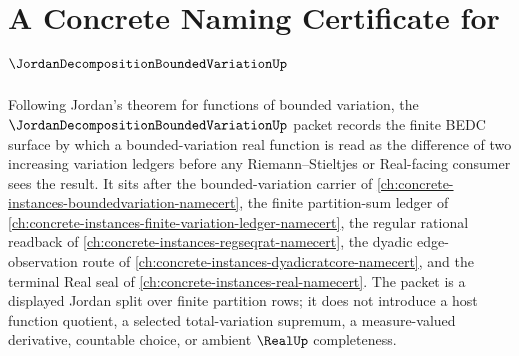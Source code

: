 \chapter{A Concrete Naming Certificate for $\JordanDecompositionBoundedVariationUp$}
\label{ch:concrete-instances-jordan-decomposition-bounded-variation-namecert}

Following Jordan's theorem for functions of bounded variation, the $\JordanDecompositionBoundedVariationUp$ packet records the finite BEDC surface by which a bounded-variation real function is read as the difference of two increasing variation ledgers before any Riemann--Stieltjes or Real-facing consumer sees the result. It sits after the bounded-variation carrier of \autoref{ch:concrete-instances-boundedvariation-namecert}, the finite partition-sum ledger of \autoref{ch:concrete-instances-finite-variation-ledger-namecert}, the regular rational readback of \autoref{ch:concrete-instances-regseqrat-namecert}, the dyadic edge-observation route of \autoref{ch:concrete-instances-dyadicratcore-namecert}, and the terminal Real seal of \autoref{ch:concrete-instances-real-namecert}. The packet is a displayed Jordan split over finite partition rows; it does not introduce a host function quotient, a selected total-variation supremum, a measure-valued derivative, countable choice, or ambient $\RealUp$ completeness.

